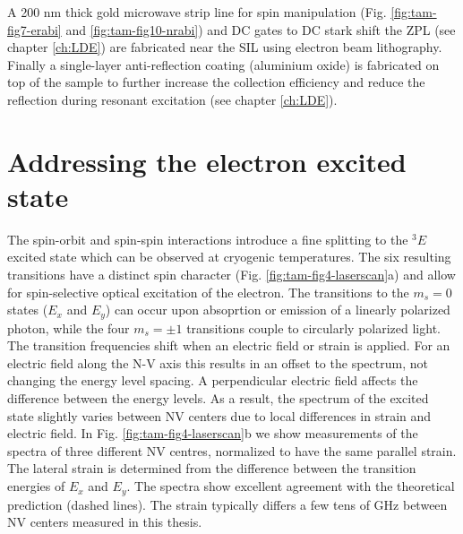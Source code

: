 A 200 nm thick gold microwave strip line for spin manipulation (Fig. \ref{fig:tam-fig7-erabi} and \ref{fig:tam-fig10-nrabi}) and DC gates to DC stark shift the ZPL (see chapter \ref{ch:LDE}) are  fabricated near the SIL using electron beam lithography. Finally a single-layer anti-reflection coating\cite{Yeung__2012} (aluminium oxide) is fabricated on top of the sample to further increase the collection efficiency and reduce the reflection during resonant excitation (see chapter \ref{ch:LDE}).

\section{Addressing the electron excited state}
\label{sec:opticalcontrol}

The spin-orbit and spin-spin interactions introduce a fine splitting to the $^3E$ excited state which can be observed at cryogenic temperatures. The six resulting transitions have a distinct spin character (Fig. \ref{fig:tam-fig4-laserscan}a) and allow for spin-selective optical excitation of the electron. The transitions to the $m_s = 0$ states ($E_x$ and $E_y$) can occur upon absoprtion or emission of a linearly polarized photon, while the four $m_s = \pm 1$ transitions couple to circularly polarized light. The transition frequencies shift when an electric field or strain is applied. For an electric field along the N-V axis this results in an offset to the spectrum, not changing the energy level spacing. A perpendicular electric field affects the difference between the energy levels. As a result, the spectrum of the excited state slightly varies between NV centers due to local differences in strain and electric field. In Fig. \ref{fig:tam-fig4-laserscan}b we show measurements of the spectra of three different NV centres, normalized to have the same parallel strain. The lateral strain is determined from the difference between the transition energies of $E_x$ and $E_y$. The spectra show excellent agreement with the theoretical prediction (dashed lines). The strain typically differs a few tens of GHz between NV centers measured in this thesis.

